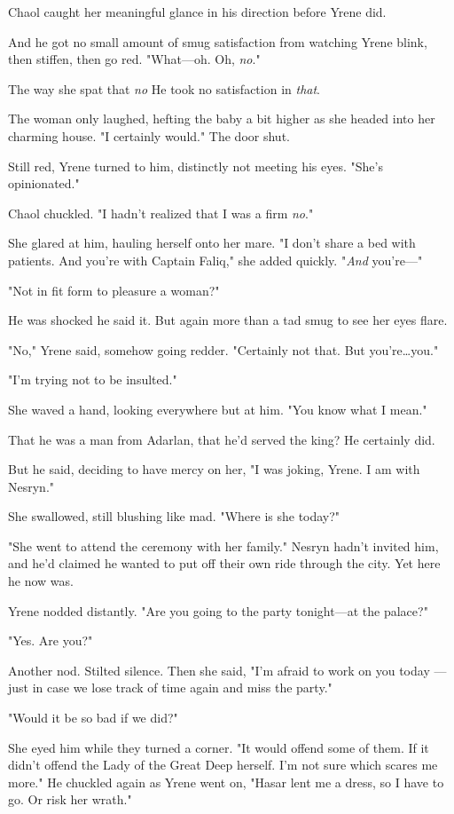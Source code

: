 Chaol caught her meaningful glance in his direction before Yrene did.

And he got no small amount of smug satisfaction from watching Yrene blink, then stiffen, then go red.
"What---oh.
Oh, \emph{no}."

The way she spat that \emph{no}  He took no satisfaction in \emph{that}.

The woman only laughed, hefting the baby a bit higher as she headed into her charming house.
"I certainly would."
The door shut.

Still red, Yrene turned to him, distinctly not meeting his eyes.
"She's opinionated."

Chaol chuckled.
"I hadn't realized that I was a firm \emph{no}."

She glared at him, hauling herself onto her mare.
"I don't share a bed with patients.
And you're with Captain Faliq," she added quickly.
"\emph{And} you're---"

"Not in fit form to pleasure a woman?"

He was shocked he said it.
But again more than a tad smug to see her eyes flare.

"No," Yrene said, somehow going redder.
"Certainly not that.
But you're\ldots you."

"I'm trying not to be insulted."

She waved a hand, looking everywhere but at him.
"You know what I mean."

That he was a man from Adarlan, that he'd served the king?
He certainly did.

But he said, deciding to have mercy on her, "I was joking, Yrene.
I  am with Nesryn."

She swallowed, still blushing like mad.
"Where is she today?"

"She went to attend the ceremony with her family."
Nesryn hadn't invited him, and he'd claimed he wanted to put off their own ride through the city.
Yet here he now was.

Yrene nodded distantly.
"Are you going to the party tonight---at the palace?"

"Yes.
Are you?"

Another nod.
Stilted silence.
Then she said, "I'm afraid to work on you today ---just in case we lose track of time again and miss the party."

"Would it be so bad if we did?"

She eyed him while they turned a corner.
"It would offend some of them.
If it didn't offend the Lady of the Great Deep herself.
I'm not sure which scares me more."
He chuckled again as Yrene went on, "Hasar lent me a dress, so I have to go.
Or risk her wrath."

